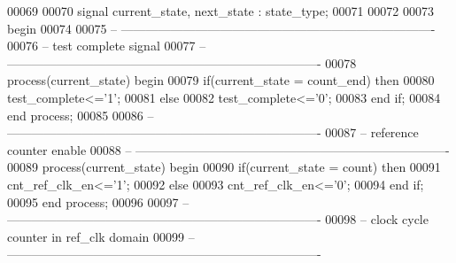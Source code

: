 \begin{DoxyCode}
00069 
00070 \textcolor{keywordflow}{signal} \textcolor{vhdlchar}{current_state}\textcolor{vhdlchar}{,} \textcolor{vhdlchar}{next_state} \textcolor{vhdlchar}{:} \textcolor{vhdlchar}{state_type};
00071 
00072   
00073 \textcolor{vhdlkeyword}{begin}
00074 
00075 \textcolor{keyword}{-- ----------------------------------------------------------------------------}
00076 \textcolor{keyword}{-- test complete signal}
00077 \textcolor{keyword}{-- ----------------------------------------------------------------------------}
00078 \textcolor{keywordflow}{process}(current_state) \textcolor{keywordflow}{begin}
00079     \textcolor{keywordflow}{if}\textcolor{vhdlchar}{(}\textcolor{vhdlchar}{current_state} \textcolor{vhdlchar}{=} \textcolor{vhdlchar}{count\_end}\textcolor{vhdlchar}{)} \textcolor{keywordflow}{then}
00080         \textcolor{vhdlchar}{test_complete}\textcolor{vhdlchar}{<=}\textcolor{vhdlchar}{'}\textcolor{vhdllogic}{}\textcolor{vhdllogic}{1}\textcolor{vhdlchar}{'};
00081     \textcolor{keywordflow}{else}
00082         \textcolor{vhdlchar}{test_complete}\textcolor{vhdlchar}{<=}\textcolor{vhdlchar}{'}\textcolor{vhdllogic}{}\textcolor{vhdllogic}{0}\textcolor{vhdlchar}{'};
00083     \textcolor{keywordflow}{end} \textcolor{keywordflow}{if};
00084 \textcolor{keywordflow}{end} \textcolor{keywordflow}{process};
00085 
00086 \textcolor{keyword}{-- ----------------------------------------------------------------------------}
00087 \textcolor{keyword}{-- reference counter enable}
00088 \textcolor{keyword}{-- ----------------------------------------------------------------------------}
00089 \textcolor{keywordflow}{process}(current_state) \textcolor{keywordflow}{begin}
00090     \textcolor{keywordflow}{if}\textcolor{vhdlchar}{(}\textcolor{vhdlchar}{current_state} \textcolor{vhdlchar}{=} \textcolor{vhdlchar}{count}\textcolor{vhdlchar}{)} \textcolor{keywordflow}{then}
00091         \textcolor{vhdlchar}{cnt_ref_clk_en}\textcolor{vhdlchar}{<=}\textcolor{vhdlchar}{'}\textcolor{vhdllogic}{}\textcolor{vhdllogic}{1}\textcolor{vhdlchar}{'};
00092     \textcolor{keywordflow}{else}
00093         \textcolor{vhdlchar}{cnt_ref_clk_en}\textcolor{vhdlchar}{<=}\textcolor{vhdlchar}{'}\textcolor{vhdllogic}{}\textcolor{vhdllogic}{0}\textcolor{vhdlchar}{'};
00094     \textcolor{keywordflow}{end} \textcolor{keywordflow}{if};
00095 \textcolor{keywordflow}{end} \textcolor{keywordflow}{process};
00096 
00097 \textcolor{keyword}{-- ----------------------------------------------------------------------------}
00098 \textcolor{keyword}{-- clock cycle counter in ref\_clk domain}
00099 \textcolor{keyword}{-- ----------------------------------------------------------------------------}

\end{DoxyCode}
